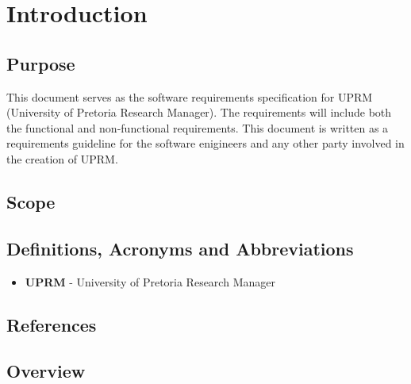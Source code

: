 \section{Introduction}

	\subsection{Purpose}
		This document serves as the software requirements specification for UPRM (University of Pretoria Research Manager). 
		The requirements will include both the functional and non-functional requirements. 
		This document is written as a requirements guideline for the software enigineers and any other party involved in the creation of UPRM.
	\subsection{Scope}
	\subsection{Definitions, Acronyms and Abbreviations}
		\begin{itemize}
			\item{\textbf{UPRM}} - University of Pretoria Research Manager
		\end{itemize}
	\subsection{References}
	\subsection{Overview}